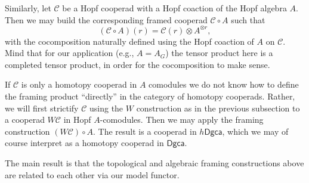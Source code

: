 \documentclass[a4paper]{amsart}
\theoremstyle{plain}
\theoremstyle{definition}
\newcommand{\op}{\mathcal}
\newcommand{\dgca}{\mathsf{Dgca}}
\newcommand{\hdgca}{h\dgca}
\begin{document}
Similarly, let $\op C$ be a Hopf cooperad with a Hopf coaction of the Hopf algebra $A$. 
Then we may build the corresponding framed cooperad $\op C\circ A$ such that 
\[
(\op C \circ A)(r) = \op C(r) \otimes A^{\otimes r},
\]
with the cocomposition naturally defined using the Hopf coaction of $A$ on $\op C$.
Mind that for our application (e.g., $A=A_G$) the tensor product here is a completed tensor product, in order for the cocomposition to make sense.

If $\op C$ is only a homotopy cooperad in $A$ comodules we do not know how to define the framing product ``directly'' in the category of homotopy cooperads.
Rather, we will first strictify $\op C$ using the $W$ construction as in the previous subsection to a cooperad $W\op C$ in Hopf $A$-comodules. Then we may apply the framing construction $(W\op C)\circ A$. The result is a cooperad in $\hdgca$, which we may of course interpret as a homotopy cooperad in $\dgca$.

The main result is that the topological and algebraic framing constructions above are related to each other via our model functor.
\end{document}
